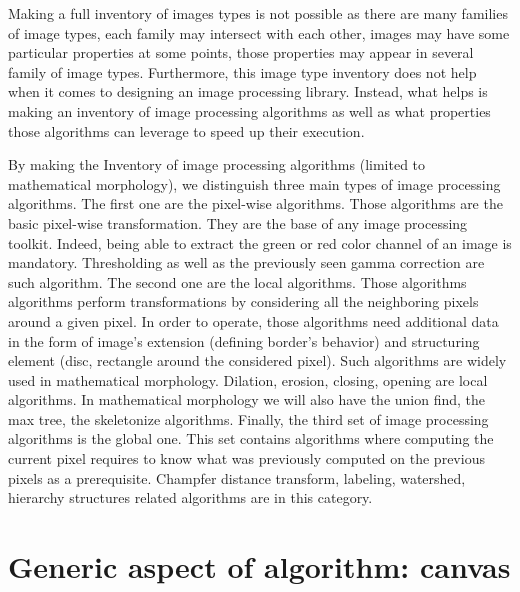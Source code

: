 Making a full inventory of images types is not possible as there are many families of image types, each family may
intersect with each other, images may have some particular properties at some points, those properties may appear in
several family of image types. Furthermore, this image type inventory does not help when it comes to designing an image
processing library. Instead, what helps is making an inventory of image processing algorithms as well as what properties
those algorithms can leverage to speed up their execution.

By making the Inventory of image processing algorithms (limited to mathematical morphology), we distinguish three main
types of image processing algorithms. The first one are the pixel-wise algorithms. Those algorithms are the basic
pixel-wise transformation. They are the base of any image processing toolkit. Indeed, being able to extract the green or
red color channel of an image is mandatory. Thresholding as well as the previously seen gamma correction are such
algorithm. The second one are the local algorithms. Those algorithms algorithms perform transformations by considering
all the neighboring pixels around a given pixel. In order to operate, those algorithms need additional data in the form
of image's extension (defining border's behavior) and structuring element (disc, rectangle around the considered pixel).
Such algorithms are widely used in mathematical morphology. Dilation, erosion, closing, opening are local algorithms. In
mathematical morphology we will also have the union find, the max tree, the skeletonize algorithms. Finally, the third
set of image processing algorithms is the global one. This set contains algorithms where computing the current pixel
requires to know what was previously computed on the previous pixels as a prerequisite. Champfer distance transform,
labeling, watershed, hierarchy structures related algorithms are in this category.


\section{Generic aspect of algorithm: canvas}
\label{sec:canvas}

